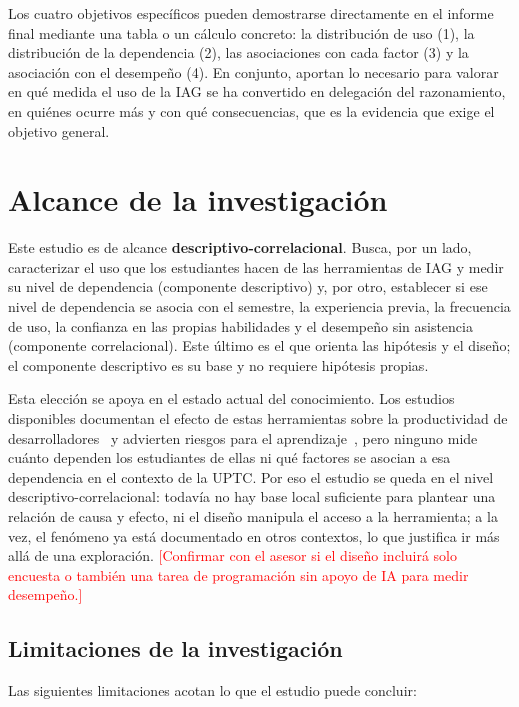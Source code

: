 \documentclass[12pt,letterpaper]{article}
\newcommand{\pendiente}[1]{\textcolor{red}{[#1]}}
\begin{document}
Los cuatro objetivos específicos pueden demostrarse directamente en el informe final mediante una tabla o un cálculo concreto: la distribución de uso (1), la distribución de la dependencia (2), las asociaciones con cada factor (3) y la asociación con el desempeño (4). En conjunto, aportan lo necesario para valorar en qué medida el uso de la IAG se ha convertido en delegación del razonamiento, en quiénes ocurre más y con qué consecuencias, que es la evidencia que exige el objetivo general.

\section{Alcance de la investigación}

Este estudio es de alcance \textbf{descriptivo-correlacional}. Busca, por un lado, caracterizar el uso que los estudiantes hacen de las herramientas de IAG y medir su nivel de dependencia (componente descriptivo) y, por otro, establecer si ese nivel de dependencia se asocia con el semestre, la experiencia previa, la frecuencia de uso, la confianza en las propias habilidades y el desempeño sin asistencia (componente correlacional). Este último es el que orienta las hipótesis y el diseño; el componente descriptivo es su base y no requiere hipótesis propias.

Esta elección se apoya en el estado actual del conocimiento. Los estudios disponibles documentan el efecto de estas herramientas sobre la productividad de desarrolladores~\cite{peng2023impact,ziegler2022measuring} y advierten riesgos para el aprendizaje~\cite{prather2023programming,martinovic2024ai,ieee2024assisted}, pero ninguno mide cuánto dependen los estudiantes de ellas ni qué factores se asocian a esa dependencia en el contexto de la UPTC. Por eso el estudio se queda en el nivel descriptivo-correlacional: todavía no hay base local suficiente para plantear una relación de causa y efecto, ni el diseño manipula el acceso a la herramienta; a la vez, el fenómeno ya está documentado en otros contextos, lo que justifica ir más allá de una exploración. \pendiente{Confirmar con el asesor si el diseño incluirá solo encuesta o también una tarea de programación sin apoyo de IA para medir desempeño.}

\subsection{Limitaciones de la investigación}

Las siguientes limitaciones acotan lo que el estudio puede concluir:
\end{document}
